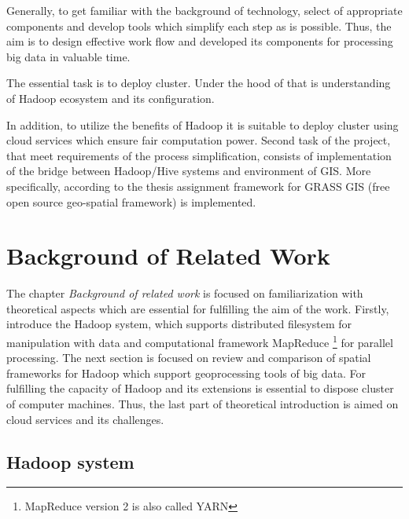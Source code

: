 \documentclass[a4paper,12pt,oneside]{report}
\begin{document}
	Generally, to get familiar with the background of technology,
	select of appropriate components and develop tools which simplify each step as is
	possible. 
	Thus, the aim is to design effective work flow and developed its
	components for processing big data in valuable time.
	
	The essential task is to deploy cluster. Under the hood of that is
	understanding of Hadoop ecosystem and its configuration. 
	
	In addition, to utilize the benefits of Hadoop it is suitable to deploy cluster using cloud
	services which ensure fair computation power. Second task of the project, that meet
	requirements of the process simplification, consists of implementation
	of the bridge between Hadoop/Hive systems and environment of GIS. More specifically,
	according to the thesis assignment framework for GRASS GIS (free open source geo-spatial framework) is implemented. 

	
	
	\newpage
	\chapter*{Background of Related Work}
	The chapter \textit{Background of related work} is focused on familiarization
	with theoretical aspects which are essential for fulfilling the aim of the work.
	Firstly, introduce the Hadoop system, which supports distributed filesystem for
	manipulation with data and computational framework MapReduce \footnote{MapReduce version 2 is also called YARN} for
	parallel processing. 
	The next section is focused on review and comparison of spatial frameworks for
	Hadoop which support geoprocessing tools of big data. For fulfilling the
	capacity of Hadoop and its extensions is essential to dispose cluster of computer
	machines. Thus, the last  part of theoretical introduction is aimed on cloud
	services and its challenges.
	\section{Hadoop system}
	\label{sec:hadoop}
\end{document}

